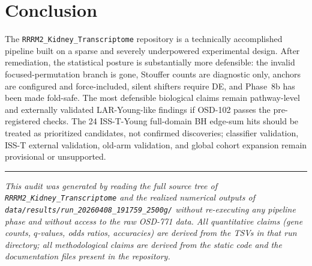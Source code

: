 \documentclass[11pt]{article}
\newcommand{\code}[1]{\texttt{#1}}
\begin{document}
\section{Conclusion}

The \code{RRRM2\_Kidney\_Transcriptome} repository is a technically accomplished pipeline built on a sparse and severely underpowered experimental design. After remediation, the statistical posture is substantially more defensible: the invalid focused-permutation branch is gone, Stouffer counts are diagnostic only, anchors are configured and force-included, silent shifters require DE, and Phase~8b has been made fold-safe. The most defensible biological claims remain pathway-level and externally validated LAR-Young-like findings if OSD-102 passes the pre-registered checks. The 24 ISS-T-Young full-domain BH edge-sum hits should be treated as prioritized candidates, not confirmed discoveries; classifier validation, ISS-T external validation, old-arm validation, and global cohort expansion remain provisional or unsupported.

\vspace{1.5em}
\begin{center}
\rule{0.4\textwidth}{0.4pt}
\end{center}
\vspace{0.5em}

\noindent\textit{This audit was generated by reading the full source tree of \code{RRRM2\_Kidney\_Transcriptome} and the realized numerical outputs of \code{data/results/run\_20260408\_191759\_2500g/} without re-executing any pipeline phase and without access to the raw OSD-771 data. All quantitative claims (gene counts, $q$-values, odds ratios, accuracies) are derived from the TSVs in that run directory; all methodological claims are derived from the static code and the documentation files present in the repository.}
\end{document}
